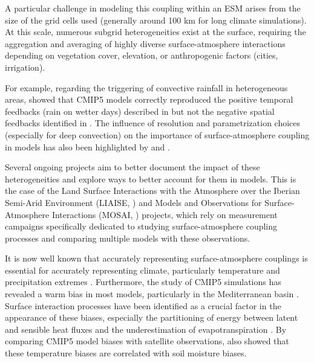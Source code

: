 A particular challenge in modeling this coupling within an ESM arises from the size of the grid cells used (generally around 100 km for long climate simulations). At this scale, numerous subgrid heterogeneities exist at the surface, requiring the aggregation and averaging of highly diverse surface-atmosphere interactions depending on vegetation cover, elevation, or anthropogenic factors (cities, irrigation).

For example, regarding the triggering of convective rainfall in heterogeneous areas, \citet{moon_soil_2019} showed that CMIP5 models correctly reproduced the positive temporal feedbacks (rain on wetter days) described in \citet{guillod_reconciling_2015} but not the negative spatial feedbacks identified in \citet{taylor_afternoon_2012}. The influence of resolution and parametrization choices (especially for deep convection) on the importance of surface-atmosphere coupling in models has also been highlighted by \citet{tuinenburg_high-resolution_2020} and \citet{lee_weaker_2024}.

Several ongoing projects aim to better document the impact of these heterogeneities and explore ways to better account for them in models. This is the case of the Land Surface Interactions with the Atmosphere over the Iberian Semi-Arid Environment (LIAISE, \cite{boone_land_2019}) and Models and Observations for Surface-Atmosphere Interactions (MOSAI, \cite{lohou_model_2022}) projects, which rely on measurement campaigns specifically dedicated to studying surface-atmosphere coupling processes and comparing multiple models with these observations.

It is now well known that accurately representing surface-atmosphere couplings is essential for accurately representing climate, particularly temperature and precipitation extremes \citep{jaeger_impact_2011, van_den_hurk_acceleration_2011}. Furthermore, the study of CMIP5 simulations has revealed a warm bias in most models, particularly in the Mediterranean basin \citep{christensen_temperature_2012, mueller_systematic_2014}. Surface interaction processes have been identified as a crucial factor in the appearance of these biases, especially the partitioning of energy between latent and sensible heat fluxes and the underestimation of evapotranspiration \citep{cheruy_combined_2013, cheruy_role_2014}. By comparing CMIP5 model biases with satellite observations, \citet{al-yaari_satellite-based_2019} also showed that these temperature biases are correlated with soil moisture biases.

